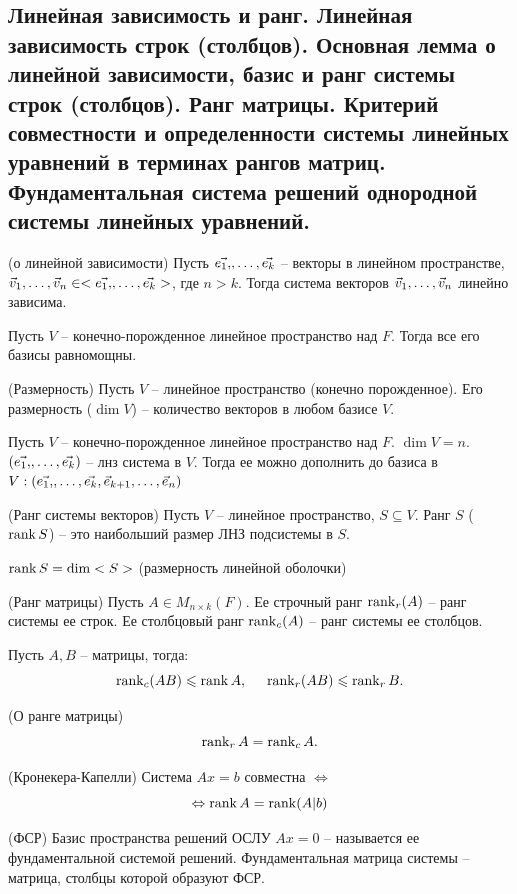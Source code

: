 \begin{multicols}{2}
\section{Линейная зависимость и ранг. Линейная зависимость строк (столбцов). Основная лемма
о линейной зависимости, базис и ранг системы строк (столбцов). Ранг матрицы.
Критерий совместности и определенности системы линейных уравнений в терминах
рангов матриц. Фундаментальная система решений однородной системы линейных
уравнений.}
\begin{lemma}{(о линейной зависимости)}{}
    Пусть $\vec{e_1,}, \ldots, \vec{e_k}$ -- векторы в линейном пространстве, $\vec{v}_1, \ldots, \vec{v}_n\in <\vec{e_1,}, \ldots, \vec{e_k}>$, где $n>k$. Тогда система векторов $\vec{v}_1, \ldots, \vec{v}_n$ линейно зависима.
\end{lemma}
\begin{theorema}{}{}
    Пусть $V$ -- конечно-порожденное линейное пространство над $F$. Тогда все его базисы равномощны.
\end{theorema}
\begin{definition}{(Размерность)}{}
    Пусть $V$ -- линейное пространство (конечно порожденное). Его размерность ($\dim V$) -- количество векторов в любом базисе $V$.
\end{definition}
\begin{theorema}{}{}
    Пусть $V$ -- конечно-порожденное линейное пространство над $F$. $\dim V = n$. $(\vec{e_1,}, \ldots, \vec{e_k})$ -- лнз система в $V$. Тогда ее можно дополнить до базиса в $V: (\vec{e_1,}, \ldots, \vec{e_k}, \vec{e}_{k+1}, \ldots, \vec{e}_n)$
\end{theorema}
\begin{definition}{(Ранг системы векторов)}{}
    Пусть  $V$ -- линейное пространство, $S\subseteq V$. Ранг $S$ ($\rank S$) -- это наибольший размер ЛНЗ подсистемы в $S$.
\end{definition}
$\rank S = \dim <S>$ (размерность линейной оболочки)
\begin{definition}{(Ранг матрицы)}{}
    Пусть $A\in M_{n\times k}(F)$. Ее строчный ранг $\rank_r(A)$ -- ранг системы ее строк. Ее столбцовый ранг $\rank_c(A)$ -- ранг системы ее столбцов.
\end{definition}
\begin{lemma}{}{}
    Пусть $A, B$ -- матрицы, тогда:
    \[\rank_c(AB) \leqslant \rank A, \hspace*{0.5cm} \rank_r (AB) \leqslant \rank_r B.\]
\end{lemma}
\begin{theorema}{(О ранге матрицы)}{}
    \[
        \rank_r A = \rank_c A.
        \]
\end{theorema}
\begin{theorema}{(Кронекера-Капелли)}{}
    Система $Ax=b$ совместна $\Longleftrightarrow$ \[
        \Leftrightarrow \rank A = \rank (A | b)\]
\end{theorema}
\begin{definition}{(ФСР)}{}
    Базис пространства решений ОСЛУ $Ax=0$ -- называется ее фундаментальной системой решений. Фундаментальная матрица системы -- матрица, столбцы которой образуют ФСР.
\end{definition}

\end{multicols}
